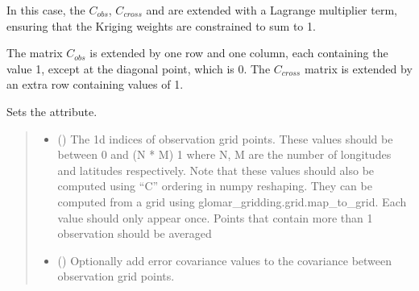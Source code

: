\documentclass[letterpaper,10pt,english]{sphinxmanual}
\begin{document}
\begin{fulllineitems}
\begin{fulllineitems}
\sphinxAtStartPar
In this case, the \(C_{obs}\), \(C_{cross}\) and are extended
with a Lagrange multiplier term, ensuring that the Kriging weights are
constrained to sum to 1.

\sphinxAtStartPar
The matrix \(C_{obs}\) is extended by one row and one column, each
containing the value 1, except at the diagonal point, which is 0. The
\(C_{cross}\) matrix is extended by an extra row containing values
of 1.

\sphinxAtStartPar
Sets the  attribute.
\begin{quote}\begin{description}
\begin{itemize}
\item {}
\sphinxAtStartPar
{} (\sphinxstyleliteralemphasis{\sphinxupquote{{[}}}\sphinxstyleliteralemphasis{\sphinxupquote{{]} }}\sphinxstyleliteralemphasis{\sphinxupquote{| }}\sphinxstyleliteralemphasis{\sphinxupquote{{[}}}\sphinxstyleliteralemphasis{\sphinxupquote{{]}}}) \textendash{} The 1d indices of observation grid points. These values should be
between 0 and (N * M) \sphinxhyphen{} 1 where N, M are the number of longitudes
and latitudes respectively. Note that these values should also be
computed using “C” ordering in numpy reshaping. They can be
computed from a grid using glomar\_gridding.grid.map\_to\_grid. Each
value should only appear once. Points that contain more than 1
observation should be averaged

\item {}
\sphinxAtStartPar
{} (\sphinxstyleliteralemphasis{\sphinxupquote{ | }}) \textendash{} Optionally add error covariance values to the covariance between
observation grid points.

\end{itemize}

\sphinxAtStartPar
{}

\end{description}\end{quote}


\end{fulllineitems}
\end{fulllineitems}
\end{document}
